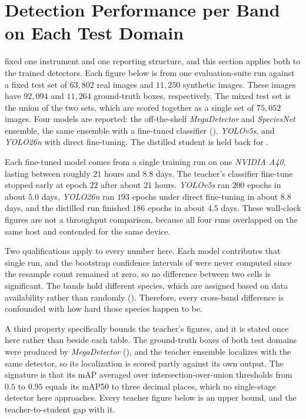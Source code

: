 \section{Detection Performance per Band on Each Test Domain}\label{sec:results_regime_comparison}

 fixed one instrument and one reporting structure, and this section applies both to the trained detectors. Each figure below is from one evaluation-suite run against a fixed test set of $63{,}802$ real images and $11{,}250$ synthetic images. These images have $92{,}094$ and $11{,}264$ ground-truth boxes, respectively.
The mixed test set is the union of the two sets, which are scored together as a single set of $75{,}052$ images. Four models are reported: the off-the-shelf \textit{MegaDetector} and \textit{SpeciesNet} ensemble, the same ensemble with a fine-tuned classifier (), \textit{YOLOv5s}, and \textit{YOLO26n} with direct fine-tuning. The distilled student is held back for .

Each fine-tuned model comes from a single training run on one \textit{NVIDIA A40}, lasting between roughly $21$ hours and $8.8$ days. The teacher's classifier fine-tune stopped early at epoch $22$ after about $21$ hours. \textit{YOLOv5s} ran $200$ epochs in about $5.0$ days, \textit{YOLO26n} ran $193$ epochs under direct fine-tuning in about $8.8$ days, and the distilled run finished $186$ epochs in about $4.5$ days.  %
These wall-clock figures are not a throughput comparison, because all four runs overlapped on the same host and contended for the same device.

Two qualifications apply to every number here. Each model contributes that single run, and the bootstrap confidence intervals of  were never computed since the resample count remained at zero, so no difference between two cells is significant.
The bands hold different species, which are assigned based on data availability rather than randomly (). Therefore, every cross-band difference is confounded with how hard those species happen to be.

A third property specifically bounds the teacher's figures, and it is stated once here rather than beside each table. The ground-truth boxes of both test domains were produced by \textit{MegaDetector} (), and the teacher ensemble localizes with the same detector, so its localization is scored partly against its own output. The signature is that its mAP averaged over intersection-over-union thresholds from $0.5$ to $0.95$ equals its mAP50 to three decimal places, which no single-stage detector here approaches. Every teacher figure below is an upper bound, and the teacher-to-student gap with it.

